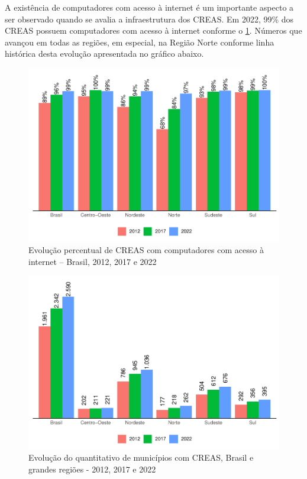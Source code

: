 \documentclass[
  brazilian]{report}
\begin{document}
A existência de computadores com acesso à internet é um importante
aspecto a ser observado quando se avalia a infraestrutura dos CREAS. Em
2022, 99\% dos CREAS possuem computadores com acesso à internet conforme
o \cref{fig:CREAS-internet-percentual}. Números que avançou em todas as
regiões, em especial, na Região Norte conforme linha histórica desta
evolução apresentada no gráfico abaixo.

\begin{figure}
\includegraphics{Censo-SUAS-2022_files/figure-latex/CREAS-internet-percentual-1} \caption[Evolução percentual de CREAS com computadores com acesso à internet – Brasil, 2012, 2017 e 2022]{Evolução percentual de CREAS com computadores com acesso à internet – Brasil, 2012, 2017 e 2022}\label{fig:CREAS-internet-percentual}
\end{figure}

\begin{figure}
\includegraphics{Censo-SUAS-2022_files/figure-latex/CREAS-quantidade-municipios-1} \caption[Evolução do quantitativo de municípios com CREAS, Brasil e grandes regiões - 2012, 2017 e 2022]{Evolução do quantitativo de municípios com CREAS, Brasil e grandes regiões - 2012, 2017 e 2022}\label{fig:CREAS-quantidade-municipios}
\end{figure}
\end{document}
